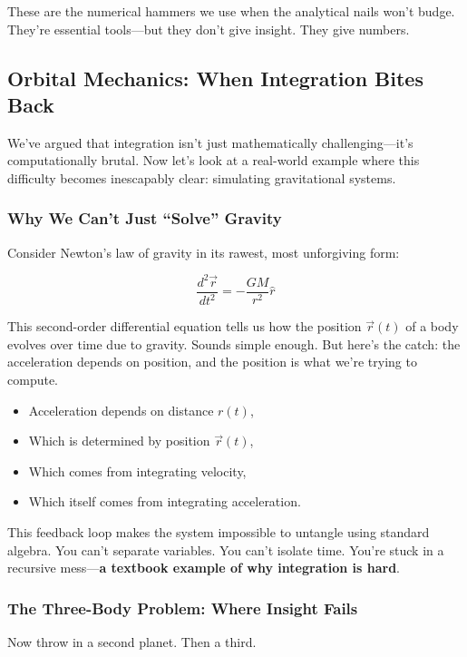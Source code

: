 These are the numerical hammers we use when the analytical nails won’t budge. They’re essential tools—but they don’t give insight. They give numbers.

\subsection{Orbital Mechanics: When Integration Bites Back}

We’ve argued that integration isn’t just mathematically challenging—it’s computationally brutal. Now let’s look at a real-world example where this difficulty becomes inescapably clear: simulating gravitational systems.

\subsubsection{Why We Can’t Just “Solve” Gravity}

Consider Newton’s law of gravity in its rawest, most unforgiving form:

\[
\frac{d^2\vec{r}}{dt^2} = -\frac{GM}{r^2} \hat{r}
\]

This second-order differential equation tells us how the position \( \vec{r}(t) \) of a body evolves over time due to gravity. Sounds simple enough. But here’s the catch: the acceleration depends on position, and the position is what we’re trying to compute.

\begin{itemize}
  \item Acceleration depends on distance \( r(t) \),
  \item Which is determined by position \( \vec{r}(t) \),
  \item Which comes from integrating velocity,
  \item Which itself comes from integrating acceleration.
\end{itemize}

This feedback loop makes the system impossible to untangle using standard algebra. You can’t separate variables. You can’t isolate time. You’re stuck in a recursive mess—\textbf{a textbook example of why integration is hard}.

\subsubsection{The Three-Body Problem: Where Insight Fails}

Now throw in a second planet. Then a third.

